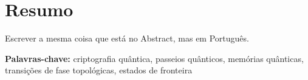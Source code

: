 

\chapter*{Resumo}

Escrever a mesma coisa que está no Abstract, mas em Português.

\vfill
\begin{flushleft}
\textbf{Palavras-chave:} criptografia qu\^{a}ntica, passeios qu\^{a}nticos, mem\'{o}rias qu\^{a}nticas, transi\c{c}\~{o}es de fase topol\'{o}gicas, estados de fronteira
\end{flushleft}
